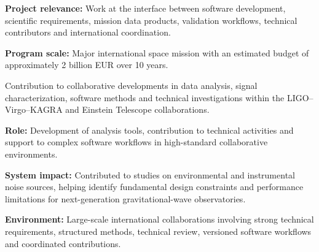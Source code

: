 \documentclass[8pt,a4paper,ragged2e,withhyper]{altacv}
\begin{document}
\textbf{Project relevance:} Work at the interface between software development, scientific requirements, mission data products, validation workflows, technical contributors and international coordination.

\textbf{Program scale:} Major international space mission with an estimated budget of approximately 2 billion EUR over 10 years.

\divider


Contribution to collaborative developments in data analysis, signal characterization, software methods and technical investigations within the LIGO--Virgo--KAGRA and Einstein Telescope collaborations.

\textbf{Role:} Development of analysis tools, contribution to technical activities and support to complex software workflows in high-standard collaborative environments.

\textbf{System impact:} Contributed to studies on environmental and instrumental noise sources, helping identify fundamental design constraints and performance limitations for next-generation gravitational-wave observatories.

\textbf{Environment:} Large-scale international collaborations involving strong technical requirements, structured methods, technical review, versioned software workflows and coordinated contributions.


\vspace{-.3cm}


{\small
{}
}

\divider\smallskip
\vspace{-.3cm}

\end{document}
